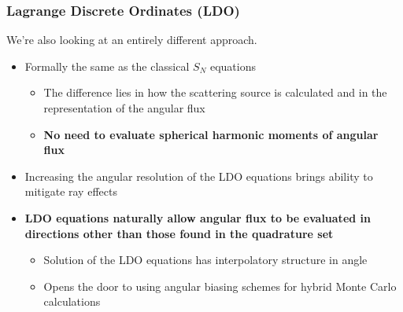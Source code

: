 \documentclass[xcolor=x11names,compress,handout]{beamer}
\renewcommand{\(}{\begin{columns}}
\renewcommand{\)}{\end{columns}}
\newcommand{\<}[1]{\begin{column}{#1}}
\renewcommand{\>}{\end{column}}
\begin{document}
\begin{frame}[fragile]

  \frametitle{Lagrange Discrete Ordinates (LDO) \cite{Ahrens2015}}

   We're also looking at an entirely different approach.    
\pause
\begin{itemize}
\item{Formally the same as the classical $S_N$ equations}
	\begin{itemize}
	\pause
	\item{The difference lies in how the scattering source is calculated and in the representation of the angular flux}
	\pause
	\item{\textbf{No need to evaluate spherical harmonic moments of angular flux}}
	\end{itemize}
\pause
\item{Increasing the angular resolution of the LDO equations brings ability to mitigate ray effects}
\pause
\item{\textbf{LDO equations naturally allow angular flux to be evaluated in directions other than those found in the quadrature set}}
	\begin{itemize}
	\pause
	\item{Solution of the LDO equations has interpolatory structure in angle}
	\pause
	\item{Opens the door to using angular biasing schemes for hybrid Monte Carlo calculations}
	\end{itemize}
\end{itemize}

\end{frame}
\end{document}
